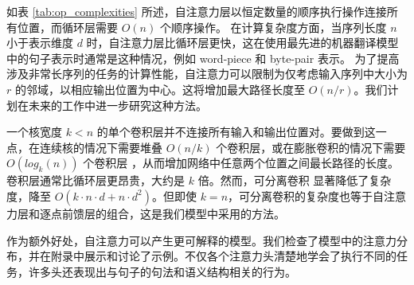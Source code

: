 





如表 \ref{tab:op_complexities} 所述，自注意力层以恒定数量的顺序执行操作连接所有位置，而循环层需要 $O(n)$ 个顺序操作。
在计算复杂度方面，当序列长度 $n$ 小于表示维度 $d$ 时，自注意力层比循环层更快，这在使用最先进的机器翻译模型中的句子表示时通常是这种情况，例如 word-piece \citep{wu2016google} 和 byte-pair \citep{sennrich2015neural} 表示。
为了提高涉及非常长序列的任务的计算性能，自注意力可以限制为仅考虑输入序列中大小为 $r$ 的邻域，以相应输出位置为中心。这将增加最大路径长度至 $O(n/r)$。我们计划在未来的工作中进一步研究这种方法。

一个核宽度 $k < n$ 的单个卷积层并不连接所有输入和输出位置对。要做到这一点，在连续核的情况下需要堆叠 $O(n/k)$ 个卷积层，或在膨胀卷积的情况下需要 $O(log_k(n))$ 个卷积层 \citep{NalBytenet2017}，从而增加网络中任意两个位置之间最长路径的长度。
卷积层通常比循环层更昂贵，大约是 $k$ 倍。然而，可分离卷积 \citep{xception2016} 显著降低了复杂度，降至 $O(k \cdot n \cdot d + n \cdot d^2)$。但即使 $k=n$，可分离卷积的复杂度也等于自注意力层和逐点前馈层的组合，这是我们模型中采用的方法。




作为额外好处，自注意力可以产生更可解释的模型。我们检查了模型中的注意力分布，并在附录中展示和讨论了示例。不仅各个注意力头清楚地学会了执行不同的任务，许多头还表现出与句子的句法和语义结构相关的行为。
